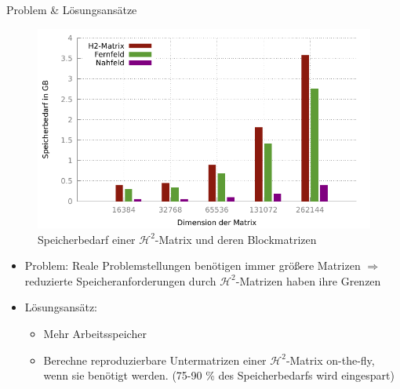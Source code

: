 \documentclass[10pt]{beamer}
\begin{document}
\begin{frame}{Problem \& Lösungsansätze}
  \begin{figure}
    \centering
    \includegraphics[width=.45\linewidth]{figures/fg-memory-h2-nf-ff.pdf}
    \caption{Speicherbedarf einer \(\mathcal{H}^2\)-Matrix und deren Blockmatrizen}
  \end{figure}
  \begin{itemize}
    \item Problem: Reale Problemstellungen benötigen immer größere Matrizen
          \(\Rightarrow\) reduzierte Speicheranforderungen durch
          \(\mathcal{H}^2\)-Matrizen haben ihre Grenzen
    \item Lösungsansätz:
    \begin{itemize}
      \item Mehr Arbeitsspeicher
      \item Berechne reproduzierbare Untermatrizen einer
            \(\mathcal{H}^2\)-Matrix on-the-fly, wenn sie benötigt werden.
            (75-90 \% des Speicherbedarfs wird eingespart)
    \end{itemize}
  \end{itemize}
\end{frame}
\end{document}
